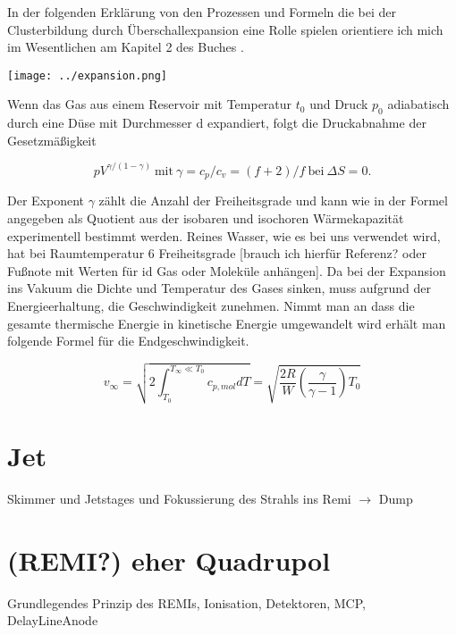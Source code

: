 In der folgenden Erklärung von den Prozessen und Formeln die bei der Clusterbildung durch Überschallexpansion eine Rolle spielen orientiere ich mich im Wesentlichen am Kapitel 2 des Buches \cite{scoles1988}.

\begin{center}
\begin{minipage}{\linewidth}
\centering
\texttt{[image: ../expansion.png]}%
 \label{fig:Machexpansion}
 
 
\end{minipage} 
\end{center} 

Wenn das Gas aus einem Reservoir mit Temperatur $t_0$ und Druck $p_0$ adiabatisch durch eine Düse mit Durchmesser d expandiert, folgt die Druckabnahme der Gesetzmäßigkeit

\begin{equation}
pV^{\gamma/(1-\gamma)}\ \mbox{mit}\ \gamma=c_p/c_v=(f+2)/f \ \mbox{bei} \ \Delta S=0.
\end{equation}

Der Exponent $\gamma$ zählt die Anzahl der Freiheitsgrade und kann wie in der Formel angegeben als Quotient aus der isobaren und isochoren Wärmekapazität experimentell bestimmt werden. Reines Wasser, wie es bei uns verwendet wird, hat bei Raumtemperatur 6 Freiheitsgrade [brauch ich hierfür Referenz? oder Fußnote mit Werten für id Gas oder Moleküle anhängen]. 
Da bei der Expansion ins Vakuum die Dichte und Temperatur des Gases sinken, muss aufgrund der Energieerhaltung, die Geschwindigkeit zunehmen. 
Nimmt man an dass die gesamte thermische Energie in kinetische Energie umgewandelt wird erhält man folgende Formel für die Endgeschwindigkeit.

\begin{equation}
v_\infty=\sqrt{2\int_{T_0}^{T_\infty \ll T_0} c_{p,mol}dT}= \sqrt{\frac{2R}{W}\left(\frac{\gamma}{\gamma-1}\right)T_0}
\end{equation}







\newpage

\section{Jet}

Skimmer und Jetstages und Fokussierung des Strahls ins Remi $\mathrm{\rightarrow}$ Dump


\section{(REMI?) eher Quadrupol}

Grundlegendes Prinzip des REMIs, Ionisation, Detektoren, MCP, DelayLineAnode


